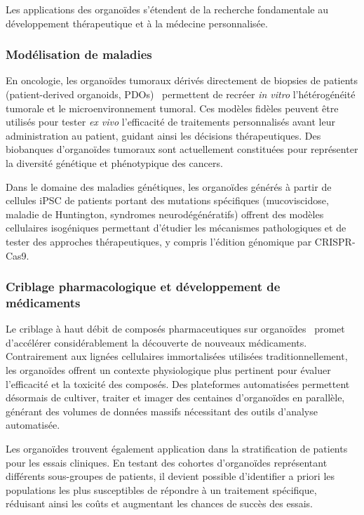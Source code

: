 Les applications des organoïdes s'étendent de la recherche fondamentale au développement thérapeutique et à la médecine personnalisée.

\subsubsection{Modélisation de maladies}

En oncologie, les organoïdes tumoraux dérivés directement de biopsies de patients (patient-derived organoids, PDOs)~\cite{Drost2019} permettent de recréer \textit{in vitro} l'hétérogénéité tumorale et le microenvironnement tumoral. Ces modèles fidèles peuvent être utilisés pour tester \textit{ex vivo} l'efficacité de traitements personnalisés avant leur administration au patient, guidant ainsi les décisions thérapeutiques. Des biobanques d'organoïdes tumoraux sont actuellement constituées pour représenter la diversité génétique et phénotypique des cancers.

Dans le domaine des maladies génétiques, les organoïdes générés à partir de cellules iPSC de patients portant des mutations spécifiques (mucoviscidose, maladie de Huntington, syndromes neurodégénératifs) offrent des modèles cellulaires isogéniques permettant d'étudier les mécanismes pathologiques et de tester des approches thérapeutiques, y compris l'édition génomique par CRISPR-Cas9.

\subsubsection{Criblage pharmacologique et développement de médicaments}

Le criblage à haut débit de composés pharmaceutiques sur organoïdes~\cite{Clevers2016,Takebe2017} promet d'accélérer considérablement la découverte de nouveaux médicaments. Contrairement aux lignées cellulaires immortalisées utilisées traditionnellement, les organoïdes offrent un contexte physiologique plus pertinent pour évaluer l'efficacité et la toxicité des composés. Des plateformes automatisées permettent désormais de cultiver, traiter et imager des centaines d'organoïdes en parallèle, générant des volumes de données massifs nécessitant des outils d'analyse automatisée.

Les organoïdes trouvent également application dans la stratification de patients pour les essais cliniques. En testant des cohortes d'organoïdes représentant différents sous-groupes de patients, il devient possible d'identifier a priori les populations les plus susceptibles de répondre à un traitement spécifique, réduisant ainsi les coûts et augmentant les chances de succès des essais.

